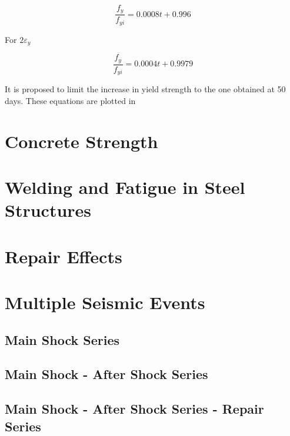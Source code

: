 \begin{equation}
  \frac{f_y}{f_{yi}}=0.0008t+0.996
  \label{eq.ten}
\end{equation} 

For $2\varepsilon_y$

\begin{equation}
  \frac{f_y}{f_{yi}}=0.0004t+0.9979
  \label{eq.eleven}
\end{equation} 

It is proposed to limit the increase in yield strength to the one obtained at 50 days. These equations are plotted in 

\section{Concrete Strength}

\section{Welding and Fatigue in Steel Structures}

\section{Repair Effects}

\section{Multiple Seismic Events}

\subsection{Main Shock Series}

\subsection{Main Shock - After Shock Series}

\subsection{Main Shock - After Shock Series - Repair Series}